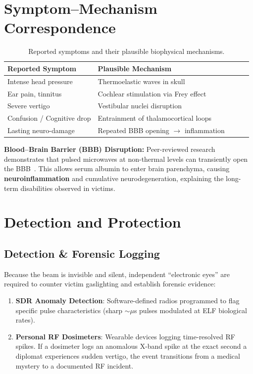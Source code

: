 \documentclass[aps,prl,twocolumn,superscriptaddress,showpacs]{revtex4-2}
\begin{document}
\section{Symptom--Mechanism Correspondence}
\label{sec:symptoms}

\begin{table}[h]
\caption{\label{tab:symptoms}
Reported symptoms and their plausible biophysical mechanisms.}
\begin{tabular}{lllll}
\toprule
\textrm{Reported Symptom} & \textrm{Plausible Mechanism} \\
\midrule
Intense head pressure & Thermoelastic waves in skull \\
Ear pain, tinnitus & Cochlear stimulation via Frey effect \\
Severe vertigo & Vestibular nuclei disruption \\
Confusion / Cognitive drop & Entrainment of thalamocortical loops \\
Lasting neuro-damage & Repeated BBB opening $\to$ inflammation \\
\bottomrule
\end{tabular}
\end{table}

\textbf{Blood--Brain Barrier (BBB) Disruption:} Peer-reviewed research demonstrates that pulsed microwaves at non-thermal levels can transiently open the BBB~\cite{Salford2003}. This allows serum albumin to enter brain parenchyma, causing \textbf{neuroinflammation} and cumulative neurodegeneration, explaining the long-term disabilities observed in victims.

\section{Detection and Protection}
\label{sec:countermeasures}

\subsection{Detection \& Forensic Logging}

Because the beam is invisible and silent, independent ``electronic eyes'' are required to counter victim gaslighting and establish forensic evidence:
\begin{enumerate}
  \item \textbf{SDR Anomaly Detection}: Software-defined radios programmed to flag specific pulse characteristics (sharp $\sim\!\mu$s pulses modulated at ELF biological rates).
  \item \textbf{Personal RF Dosimeters}: Wearable devices logging time-resolved RF spikes. If a dosimeter logs an anomalous X-band spike at the exact second a diplomat experiences sudden vertigo, the event transitions from a medical mystery to a documented RF incident.
\end{enumerate}
\end{document}
